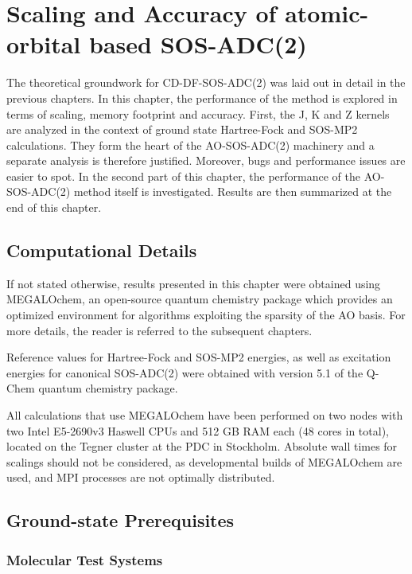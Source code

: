 \chapter{Scaling and Accuracy of atomic-orbital based SOS-ADC(2)}

The theoretical groundwork for CD-DF-SOS-ADC(2) was laid out in detail in the previous chapters. In this chapter, the performance of the method is explored in terms of scaling, memory footprint and accuracy. First, the J, K and Z kernels are analyzed in the context of ground state Hartree-Fock and SOS-MP2 calculations. They form the heart of the AO-SOS-ADC(2) machinery and a separate analysis is therefore justified. Moreover, bugs and performance issues are easier to spot. In the second part of this chapter, the performance of the AO-SOS-ADC(2) method itself is investigated. Results are then summarized at the end of this chapter. 

\section{Computational Details}

If not stated otherwise, results presented in this chapter were obtained using MEGALOchem, an open-source quantum chemistry package which provides an optimized environment for algorithms exploiting the sparsity of the AO basis. For more details, the reader is referred to the subsequent chapters.

Reference values for Hartree-Fock and SOS-MP2 energies, as well as excitation energies for canonical SOS-ADC(2) were obtained with version 5.1 of the Q-Chem quantum chemistry package.

All calculations that use MEGALOchem have been performed on two nodes with two Intel E5-2690v3 Haswell CPUs and 512 GB RAM each (48 cores in total), located on the Tegner cluster at the PDC in Stockholm. Absolute wall times for scalings should not be considered, as developmental builds of MEGALOchem are used, and MPI processes are not optimally distributed.  

\section{Ground-state Prerequisites}

\subsection{Molecular Test Systems}


